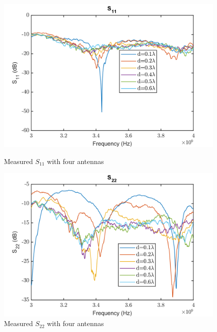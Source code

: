 \begin{figure}[H]
  \centering
  \begin{minipage}[b]{0.5\textwidth}
	\includegraphics[scale = 0.5]{figures/measurement/antennas/spar_four_ant_s11.png}
	\caption{Measured $S_{11}$ with four antennas}
    \label{fig:chamber_four_ant_s11}
  \end{minipage}
  \hfill
  \begin{minipage}[b]{0.4\textwidth}
\includegraphics[scale = 0.5]{figures/measurement/antennas/spar_four_ant_s22.png}
\caption{Measured $S_{22}$ with four antennas}
    \label{fig:chamber_four_ant_s22}
  \end{minipage}
\end{figure}



